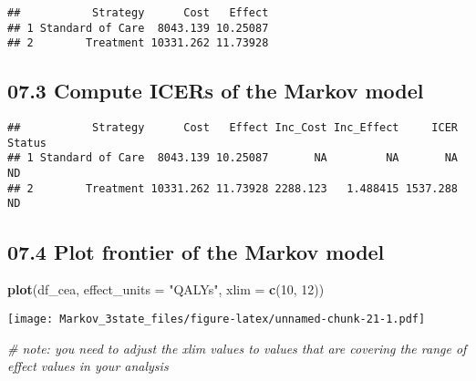 \documentclass[
]{article}
\newenvironment{Shaded}{\begin{snugshade}}{\end{snugshade}}
\newcommand{\CommentTok}[1]{\textcolor[rgb]{0.56,0.35,0.01}{\textit{#1}}}
\newcommand{\DataTypeTok}[1]{\textcolor[rgb]{0.13,0.29,0.53}{#1}}
\newcommand{\DecValTok}[1]{\textcolor[rgb]{0.00,0.00,0.81}{#1}}
\newcommand{\KeywordTok}[1]{\textcolor[rgb]{0.13,0.29,0.53}{\textbf{#1}}}
\newcommand{\NormalTok}[1]{#1}
\newcommand{\OperatorTok}[1]{\textcolor[rgb]{0.81,0.36,0.00}{\textbf{#1}}}
\newcommand{\StringTok}[1]{\textcolor[rgb]{0.31,0.60,0.02}{#1}}
\begin{document}
\begin{verbatim}
##           Strategy      Cost   Effect
## 1 Standard of Care  8043.139 10.25087
## 2        Treatment 10331.262 11.73928
\end{verbatim}

\hypertarget{compute-icers-of-the-markov-model}{%
\subsection{07.3 Compute ICERs of the Markov
model}\label{compute-icers-of-the-markov-model}}

\begin{Shaded}
\end{Shaded}

\begin{verbatim}
##           Strategy      Cost   Effect Inc_Cost Inc_Effect     ICER Status
## 1 Standard of Care  8043.139 10.25087       NA         NA       NA     ND
## 2        Treatment 10331.262 11.73928 2288.123   1.488415 1537.288     ND
\end{verbatim}

\hypertarget{plot-frontier-of-the-markov-model}{%
\subsection{07.4 Plot frontier of the Markov
model}\label{plot-frontier-of-the-markov-model}}

\begin{Shaded}
\begin{Highlighting}[]
\KeywordTok{plot}\NormalTok{(df_cea, }\DataTypeTok{effect_units =} \StringTok{"QALYs"}\NormalTok{, }\DataTypeTok{xlim =} \KeywordTok{c}\NormalTok{(}\DecValTok{10}\NormalTok{, }\DecValTok{12}\NormalTok{))}
\end{Highlighting}
\end{Shaded}

\texttt{[image: Markov\_3state\_files/figure-latex/unnamed-chunk-21-1.pdf]}

\begin{Shaded}
\begin{Highlighting}[]
\CommentTok{# note: you need to adjust the xlim values to values that are covering the range of effect values in your analysis}
\end{Highlighting}
\end{Shaded}
\end{document}
